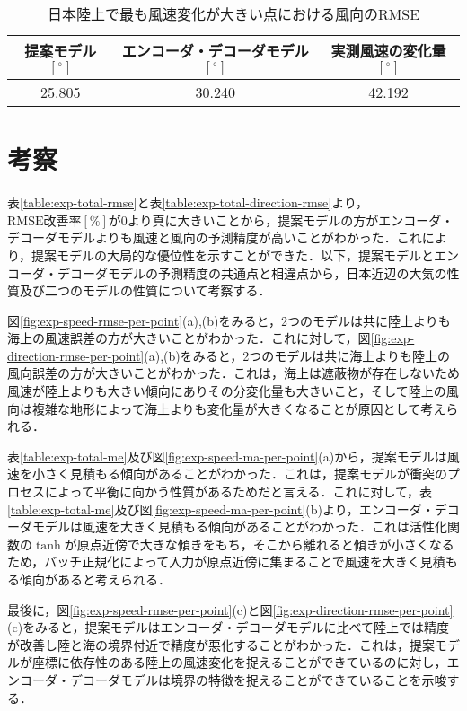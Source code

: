 \begin{table}[bp]
  \caption{日本陸上で最も風速変化が大きい点における風向のRMSE}
  \label{table:exp-max-diff-point-direction}
  \centering
  \begin{tabular}{ccc}
    \hline
    提案モデル $\mathrm{[^\circ]}$ & エンコーダ・デコーダモデル $\mathrm{[^\circ]}$ & 実測風速の変化量 $\mathrm{[^\circ]}$ \\
    \hline
    25.805 & 30.240 & 42.192 \\
    \hline
  \end{tabular}
\end{table}

\section{考察 \label{section:exp-discussion}}
表\ref{table:exp-total-rmse}と表\ref{table:exp-total-direction-rmse}より，$\mathrm{RMSE改善率[\%]}$が0より真に大きいことから，提案モデルの方がエンコーダ・デコーダモデルよりも風速と風向の予測精度が高いことがわかった．これにより，提案モデルの大局的な優位性を示すことができた．以下，提案モデルとエンコーダ・デコーダモデルの予測精度の共通点と相違点から，日本近辺の大気の性質及び二つのモデルの性質について考察する．

図\ref{fig:exp-speed-rmse-per-point}(a),(b)をみると，2つのモデルは共に陸上よりも海上の風速誤差の方が大きいことがわかった．これに対して，図\ref{fig:exp-direction-rmse-per-point}(a),(b)をみると，2つのモデルは共に海上よりも陸上の風向誤差の方が大きいことがわかった．これは，海上は遮蔽物が存在しないため風速が陸上よりも大きい傾向にありその分変化量も大きいこと，そして陸上の風向は複雑な地形によって海上よりも変化量が大きくなることが原因として考えられる．

表\ref{table:exp-total-me}及び図\ref{fig:exp-speed-ma-per-point}(a)から，提案モデルは風速を小さく見積もる傾向があることがわかった．これは，提案モデルが衝突のプロセスによって平衡に向かう性質があるためだと言える．これに対して，表\ref{table:exp-total-me}及び図\ref{fig:exp-speed-ma-per-point}(b)より，エンコーダ・デコーダモデルは風速を大きく見積もる傾向があることがわかった．これは活性化関数の$\tanh$が原点近傍で大きな傾きをもち，そこから離れると傾きが小さくなるため，バッチ正規化によって入力が原点近傍に集まることで風速を大きく見積もる傾向があると考えられる．

最後に，図\ref{fig:exp-speed-rmse-per-point}(c)と図\ref{fig:exp-direction-rmse-per-point}(c)をみると，提案モデルはエンコーダ・デコーダモデルに比べて陸上では精度が改善し陸と海の境界付近で精度が悪化することがわかった．これは，提案モデルが座標に依存性のある陸上の風速変化を捉えることができているのに対し，エンコーダ・デコーダモデルは境界の特徴を捉えることができていることを示唆する．


